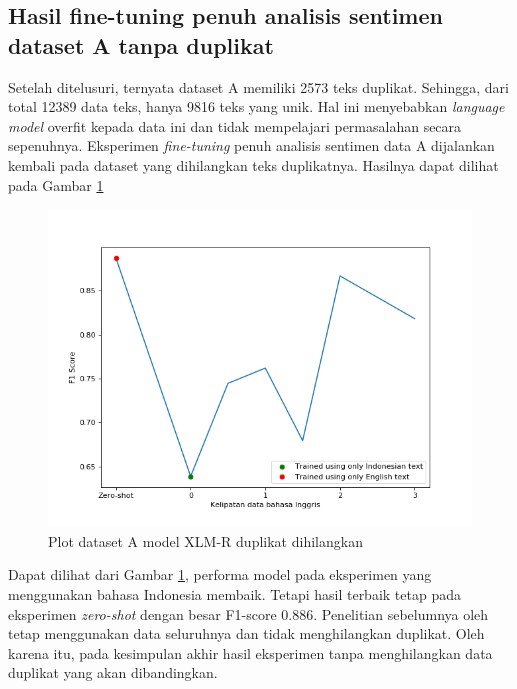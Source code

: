         

    \subsection{Hasil fine-tuning penuh analisis sentimen dataset A tanpa duplikat}
        Setelah ditelusuri, ternyata dataset A memiliki 2573 teks duplikat. Sehingga, dari total 12389 data teks, hanya 9816 teks yang unik. Hal ini menyebabkan \textit{language model} overfit kepada data ini dan tidak mempelajari permasalahan secara sepenuhnya. Eksperimen \textit{fine-tuning} penuh analisis sentimen data A dijalankan kembali pada dataset yang dihilangkan teks duplikatnya. Hasilnya dapat dilihat pada Gambar \ref{fig:plot_fuLL_trip_duplicate}

        \begin{figure}[htb]
            \centering
            \includegraphics[width=0.9\linewidth]{resources/plot-full-trip-advisor-xlmr-duplicate.png}
            \caption{Plot dataset A model XLM-R duplikat dihilangkan}\label{fig:plot_fuLL_trip_duplicate}
        \end{figure}

        Dapat dilihat dari Gambar \ref{fig:plot_fuLL_trip_duplicate}, performa model pada eksperimen yang menggunakan bahasa Indonesia membaik. Tetapi hasil terbaik tetap pada eksperimen \textit{zero-shot} dengan besar F1-score 0.886. Penelitian sebelumnya oleh \parencite{FarhanKhodra2017} tetap menggunakan data seluruhnya dan tidak menghilangkan duplikat. Oleh karena itu, pada kesimpulan akhir hasil eksperimen tanpa menghilangkan data duplikat yang akan dibandingkan.
    
        

